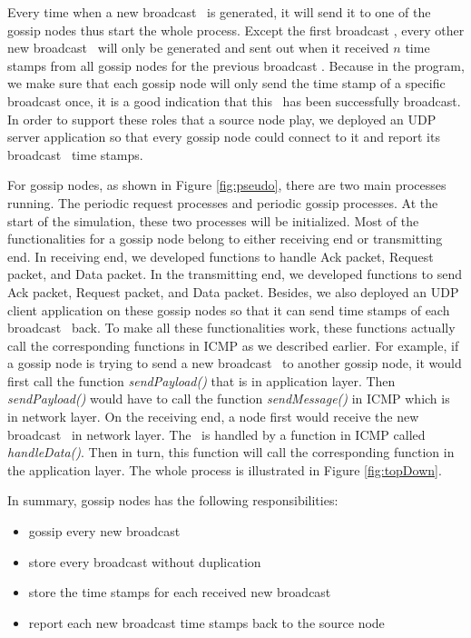 Every time when a new broadcast \msg ~is generated, it will send it to one of the gossip nodes thus start the whole process. Except the first broadcast \msg, every other new broadcast \msg ~will only be generated and sent out when it received $n$ time stamps from all gossip nodes for the previous broadcast \msg. Because in the program, we make sure that each gossip node will only send the time stamp of a specific broadcast \msg once, it is a good indication that this \msg ~has been successfully broadcast. In order to support these roles that a source node play, we deployed an UDP server application so that every gossip node could connect to it and report its broadcast \msg ~time stamps. 

For gossip nodes, as shown in Figure \ref{fig:pseudo}, there are two main processes running. The periodic request processes and periodic gossip processes. At the start of the simulation, these two processes will be initialized. Most of the functionalities for a gossip node belong to either receiving end or transmitting end. In receiving end, we developed functions to handle Ack packet, Request packet, and Data packet. In the transmitting end, we developed functions to send Ack packet, Request packet, and Data packet. Besides, we also deployed an UDP client application on these gossip nodes so that it can send time stamps of each broadcast \msg ~back. To make all these functionalities work, these functions actually call the corresponding functions in ICMP as we described earlier. For example, if a gossip node is trying to send a new broadcast \msg ~to another gossip node, it would first call the function \emph{sendPayload()} that is in application layer. Then \emph{sendPayload()} would have to call the function \emph{sendMessage()} in ICMP which is in network layer. On the receiving end, a node first would receive the new broadcast \msg ~in network layer. The \msg ~is handled by a function in ICMP called \emph{handleData()}. Then in turn, this function will call the corresponding function in the application layer. The whole process is illustrated in Figure \ref{fig:topDown}.

In summary, gossip nodes has the following responsibilities:
\begin{itemize}
	\item gossip every new broadcast \msg
	\item store every broadcast \msg without duplication
	\item store the time stamps for each received new broadcast \msg
	\item report each new broadcast \msg time stamps back to the source node
\end{itemize}


